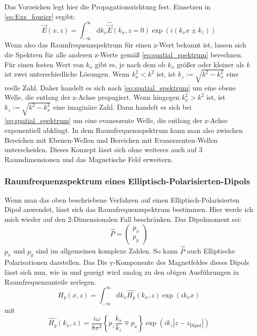 \documentclass{article}
\begin{document}
	Das Vorzeichen legt hier die Propagationsrichtung fest.
	Einsetzen in \eqref{eq:Exz_fourier} ergibt:
		\begin{equation}
			\label{eq:Espatial_spektrum}
			\vec{E}(x,z) = \int_{-\infty}^{\infty}\mathrm{d}{k_x}\hat{\vec{E}}(k_x,z= 0)\exp(i(k_xx\pm k_ z))
		\end{equation}
	Wenn also das Raumfrequenzspektrum für einen z-Wert bekannt ist, lassen sich die Spektren für alle anderen z-Werte gemäß \eqref{eq:spatial_spektrum} berechnen. Für einen festen Wert von $k_x$ gibt es, je nach dem ob $k_x$ größer oder kleiner als $k$ ist zwei unterschiedliche Lösungen. Wenn $k_x^2 < k^2$ ist, ist $k_z := \sqrt{k^2-k_x^2}$ eine reelle Zahl. Daher handelt es sich nach \eqref{eq:spatial_spektrum} um eine ebene Welle, die entlang der z-Achse propagiert.
	Wenn hingegen $k_x^2 > k^2$ ist, ist $k_z := \sqrt{k^2-k_x^2}$ eine imaginäre Zahl. Dann handelt es sich bei \eqref{eq:spatial_spektrum} um eine evaneszente Welle, die entlang der z-Achse exponentiell abklingt. In dem Raumfrequenzspektrum kann man also zwischen Bereichen mit Ebenen-Wellen und  Bereichen mit Evaneszenten-Wellen unterscheiden. Dieses Konzept lässt sich ohne weiteres auch auf 3 Raumdimensionen und das Magnetische Feld erweitern.
	\subsubsection{Raumfrequenzspektrum eines Elliptisch-Polarisierten-Dipols}
		Wenn man das oben beschriebene Verfahren auf einen Elliptisch-Polarisierten Dipol anwendet, lässt sich das Raumfrequenzspektrum bestimmen. Hier werde ich mich wieder auf den 2-Dimensionalen Fall beschränken. Das Dipolmoment sei: $$\vec{P}= \begin{pmatrix} p_x \\ p_y \end{pmatrix}$$
		$p_x$ und $p_y$ sind im allgemeinen komplexe Zahlen. So kann $\vec{P}$ auch Elliptische Polarisationen darstellen. Das Die y-Komponente des Magnetfeldes dieses Dipols lässt sich nun, wie in \cite{Novotny.2012b} und \cite{RodriguezFortuno.2013} gezeigt wird analog zu den obigen Ausführungen in Raumfrequenzanteile zerlegen.
		\begin{equation}
			H_y(x, z) = \int_{-\infty}^{\infty}\mathrm{d}k_x\hat{H_y}(k_x, z)\exp(ik_xx)
		\end{equation}
		mit
		\begin{equation}
			\boxed{\hat{H_y}(k_x, z) = \dfrac{i\omega}{8\pi^2}\left\{p_z\dfrac{k_x}{k_z} \mp p_x\right\}\exp(ik_z|z-z_{\mathrm{Dipol}}|)}
		\end{equation}
\end{document}
